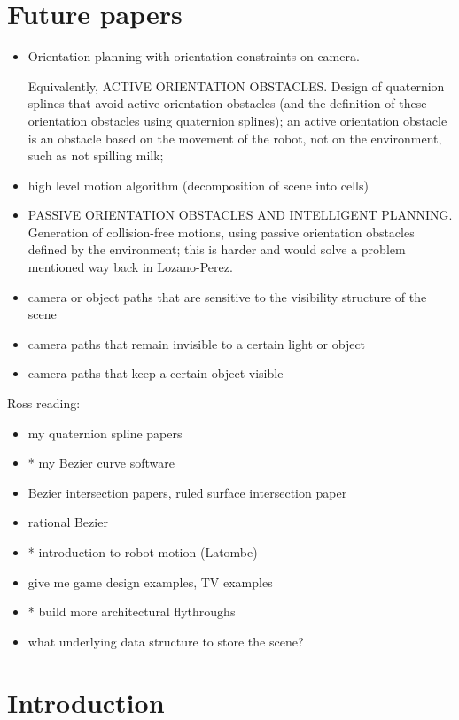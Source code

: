 \documentclass[12pt]{article}
\begin{document}
\section{Future papers}

\begin{itemize}
\item Orientation planning with orientation constraints on camera.

Equivalently, ACTIVE ORIENTATION OBSTACLES.
Design of quaternion splines that avoid active orientation obstacles
(and the definition of these orientation obstacles using quaternion splines);
an active orientation obstacle is an obstacle based on the movement of the robot,
not on the environment, such as not spilling milk;

\item high level motion algorithm (decomposition of scene into cells)

\item PASSIVE ORIENTATION OBSTACLES AND INTELLIGENT PLANNING.
Generation of collision-free motions, using
passive orientation obstacles defined by the environment; this is harder
and would solve a problem mentioned way back in Lozano-Perez.

\item camera or object paths that are sensitive to the visibility structure of the scene
\item camera paths that remain invisible to a certain light or object
\item camera paths that keep a certain object visible
\end{itemize}

Ross reading:
\begin{itemize}
\item my quaternion spline papers
\item * my Bezier curve software
\item Bezier intersection papers, ruled surface intersection paper
\item rational Bezier
\item * introduction to robot motion (Latombe)
\item give me game design examples, TV examples
\item * build more architectural flythroughs
\item what underlying data structure to store the scene?
\end{itemize}


\section{Introduction}
\end{document}
